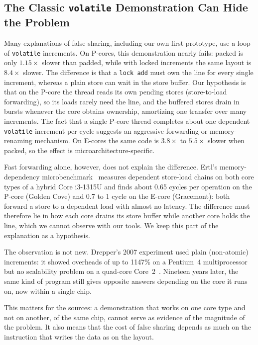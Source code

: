 \documentclass[journal]{IEEEtran}
\begin{document}
\subsection{The Classic \texttt{volatile} Demonstration Can Hide the Problem}
Many explanations of false sharing, including our own first prototype, use a
loop of \texttt{volatile} increments. On P-cores, this demonstration nearly
fails: packed is only $1.15\times$ slower than padded, while with locked
increments the same layout is $8.4\times$ slower. The difference is that a
\texttt{lock add} must own the line for every single increment, whereas a plain
store can wait in the store buffer. Our hypothesis is that on the P-core the
thread reads its own pending stores (store-to-load forwarding), so its loads
rarely need the line, and the buffered stores drain in bursts whenever the
core obtains ownership, amortizing one transfer over many increments. The fact
that a single P-core thread completes about one dependent \texttt{volatile}
increment per cycle suggests an aggressive forwarding or memory-renaming
mechanism. On E-cores the same code is $3.8\times$ to $5.5\times$ slower when
packed, so the effect is microarchitecture-specific.

Fast forwarding alone, however, does not explain the difference. Ertl's
memory-dependency microbenchmark~\cite{ertl_memdep} measures dependent
store-load chains on both core types of a hybrid Core i3-1315U and finds about
0.65 cycles per operation on the P-core (Golden Cove) and 0.7 to 1 cycle on the
E-core (Gracemont): both forward a store to a dependent load with almost no
latency. The difference must therefore lie in how each core drains its store
buffer while another core holds the line, which we cannot observe with our
tools. We keep this part of the explanation as a hypothesis.

The observation is not new. Drepper's 2007 experiment used plain (non-atomic)
increments: it showed overheads of up to 1147\% on a Pentium~4
multiprocessor but no scalability problem on a quad-core Core~2~\cite{drepper2007memory}.
Nineteen years later, the same kind of program still gives opposite answers
depending on the core it runs on, now within a single chip.

This matters for the sources: a demonstration that works on one core type and
not on another, of the same chip, cannot serve as evidence of the magnitude of
the problem. It also means that the cost of false sharing depends as much on
the instruction that writes the data as on the layout.
\end{document}
